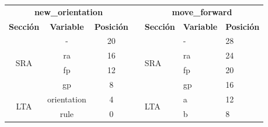 \documentclass[a4paper, 10pt, twoside, notitlepage]{article}
\begin{document}
\begin{table}[htp]
\centering
\begin{tabular}{cccllll}
\multicolumn{3}{c}{\textbf{new\_orientation}}                                                                                &                       & \multicolumn{3}{c}{\textbf{move\_forward}}                                                                                  \\ \cline{1-3} \cline{6-7} 
\multicolumn{1}{|c|}{\textbf{Sección}}     & \multicolumn{1}{c|}{\textbf{Variable}} & \multicolumn{1}{c|}{\textbf{Posición}} & \multicolumn{1}{l|}{} & \multicolumn{1}{l|}{\textbf{Sección}}     & \multicolumn{1}{l|}{\textbf{Variable}} & \multicolumn{1}{l|}{\textbf{Posición}} \\ \cline{1-3} \cline{5-7} 
\multicolumn{1}{|c|}{\multirow{4}{*}{SRA}} & \multicolumn{1}{c|}{-}                 & \multicolumn{1}{c|}{20}                & \multicolumn{1}{l|}{} & \multicolumn{1}{l|}{\multirow{4}{*}{SRA}} & \multicolumn{1}{l|}{-}                 & \multicolumn{1}{l|}{28}                \\ \cline{2-3} \cline{6-7} 
\multicolumn{1}{|c|}{}                     & \multicolumn{1}{c|}{ra}                & \multicolumn{1}{c|}{16}                & \multicolumn{1}{l|}{} & \multicolumn{1}{l|}{}                     & \multicolumn{1}{l|}{ra}                & \multicolumn{1}{l|}{24}                \\ \cline{2-3} \cline{6-7} 
\multicolumn{1}{|c|}{}                     & \multicolumn{1}{c|}{fp}                & \multicolumn{1}{c|}{12}                & \multicolumn{1}{l|}{} & \multicolumn{1}{l|}{}                     & \multicolumn{1}{l|}{fp}                & \multicolumn{1}{l|}{20}                \\ \cline{2-3} \cline{6-7} 
\multicolumn{1}{|c|}{}                     & \multicolumn{1}{c|}{gp}                & \multicolumn{1}{c|}{8}                 & \multicolumn{1}{l|}{} & \multicolumn{1}{l|}{}                     & \multicolumn{1}{l|}{gp}                & \multicolumn{1}{l|}{16}                \\ \cline{1-3} \cline{5-7} 
\multicolumn{1}{|c|}{\multirow{2}{*}{LTA}} & \multicolumn{1}{c|}{orientation}       & \multicolumn{1}{c|}{4}                 & \multicolumn{1}{l|}{} & \multicolumn{1}{l|}{\multirow{4}{*}{LTA}} & \multicolumn{1}{l|}{a}                 & \multicolumn{1}{l|}{12}                \\ \cline{2-3} \cline{6-7} 
\multicolumn{1}{|c|}{}                     & \multicolumn{1}{c|}{rule}              & \multicolumn{1}{c|}{0}                 & \multicolumn{1}{l|}{} & \multicolumn{1}{l|}{}                     & \multicolumn{1}{l|}{b}                 & \multicolumn{1}{l|}{8}                 \\ \cline{1-3} \cline{6-7} 

\end{tabular}
\end{table}
\end{document}
